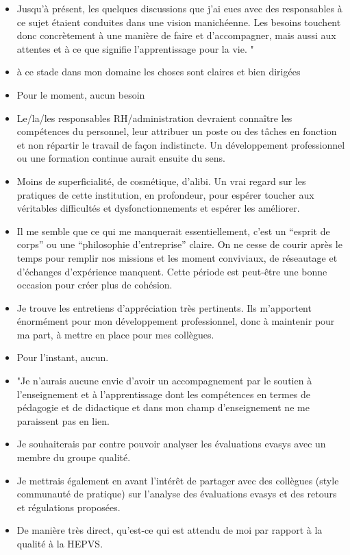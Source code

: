 \documentclass[
  french,
]{article}
\begin{document}
\begin{itemize}
\item
  Jusqu'à présent, les quelques discussions que j'ai eues avec des responsables à ce sujet étaient conduites dans une vision manichéenne.
  Les besoins touchent donc concrètement à une manière de faire et d'accompagner, mais aussi aux attentes et à ce que signifie l'apprentissage pour la vie. "
\item
  à ce stade dans mon domaine les choses sont claires et bien dirigées
\item
  Pour le moment, aucun besoin
\item
  Le/la/les responsables RH/administration devraient connaître les compétences du personnel, leur attribuer un poste ou des tâches en fonction et non répartir le travail de façon indistincte. Un développement professionnel ou une formation continue aurait ensuite du sens.
\item
  Moins de superficialité, de cosmétique, d'alibi. Un vrai regard sur les pratiques de cette institution, en profondeur, pour espérer toucher aux véritables difficultés et dysfonctionnements et espérer les améliorer.
\item
  Il me semble que ce qui me manquerait essentiellement, c'est un ``esprit de corps'' ou une ``philosophie d'entreprise'' claire. On ne cesse de courir après le temps pour remplir nos missions et les moment conviviaux, de réseautage et d'échanges d'expérience manquent. Cette période est peut-être une bonne occasion pour créer plus de cohésion.
\item
  Je trouve les entretiens d'appréciation très pertinents. Ils m'apportent énormément pour mon développement professionnel, donc à maintenir pour ma part, à mettre en place pour mes collègues.
\item
  Pour l'instant, aucun.
\item
  "Je n'aurais aucune envie d'avoir un accompagnement par le soutien à l'enseignement et à l'apprentissage dont les compétences en termes de pédagogie et de didactique et dans mon champ d'enseignement ne me paraissent pas en lien.
\item
  Je souhaiterais par contre pouvoir analyser les évaluations evasys avec un membre du groupe qualité.
\item
  Je mettrais également en avant l'intérêt de partager avec des collègues (style communauté de pratique) sur l'analyse des évaluations evasys et des retours et régulations proposées.
\item
  De manière très direct, qu'est-ce qui est attendu de moi par rapport à la qualité à la HEPVS.

\end{itemize}
\end{document}
